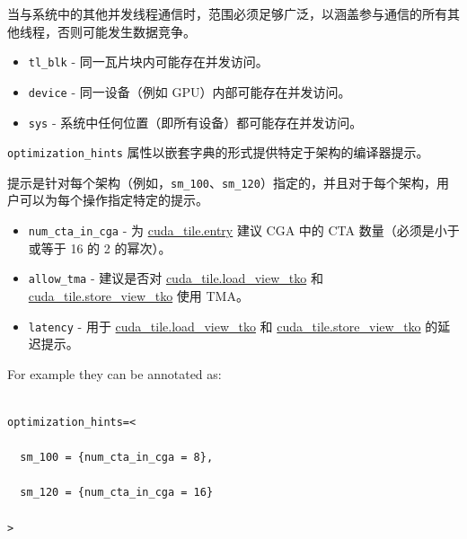 \documentclass{article}
\begin{document}
当与系统中的其他并发线程通信时，范围必须足够广泛，以涵盖参与通信的所有其他线程，否则可能发生数据竞争。



\begin{itemize}
\item \texttt{tl\_blk} - 同一瓦片块内可能存在并发访问。
\item \texttt{device} - 同一设备（例如 GPU）内部可能存在并发访问。
\item \texttt{sys} - 系统中任何位置（即所有设备）都可能存在并发访问。


\end{itemize}
\texttt{optimization\_hints} 属性以嵌套字典的形式提供特定于架构的编译器提示。



提示是针对每个架构（例如，\texttt{sm\_100}、\texttt{sm\_120}）指定的，并且对于每个架构，用户可以为每个操作指定特定的提示。



\begin{itemize}
\item \texttt{num\_cta\_in\_cga} - 为 \href{https://docs.nvidia.com/cuda/tile-ir/latest/sections/operations.html#op-cuda-tile-entry}{cuda\_tile.entry} 建议 CGA 中的 CTA 数量（必须是小于或等于 16 的 2 的幂次）。
\item \texttt{allow\_tma} - 建议是否对 \href{https://docs.nvidia.com/cuda/tile-ir/latest/sections/operations.html#op-cuda-tile-load-view-tko}{cuda\_tile.load\_view\_tko} 和 \href{https://docs.nvidia.com/cuda/tile-ir/latest/sections/operations.html#op-cuda-tile-store-view-tko}{cuda\_tile.store\_view\_tko} 使用 TMA。
\item \texttt{latency} - 用于 \href{https://docs.nvidia.com/cuda/tile-ir/latest/sections/operations.html#op-cuda-tile-load-view-tko}{cuda\_tile.load\_view\_tko} 和 \href{https://docs.nvidia.com/cuda/tile-ir/latest/sections/operations.html#op-cuda-tile-store-view-tko}{cuda\_tile.store\_view\_tko} 的延迟提示。


\end{itemize}
For example they can be annotated as:




\begin{lstlisting}

optimization_hints=<

  sm_100 = {num_cta_in_cga = 8},

  sm_120 = {num_cta_in_cga = 16}

>

\end{lstlisting}
\end{document}
